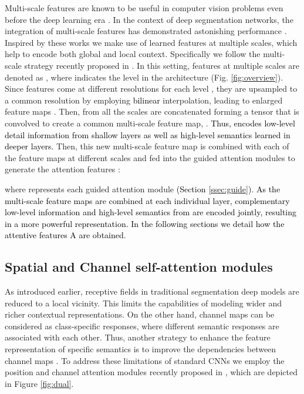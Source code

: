 \documentclass[journal]{IEEEtran}
\begin{document}
Multi-scale features are known to be useful in computer vision problems even before the deep learning era \cite{arbelaez2010contour}. In the context of deep segmentation networks, the integration of multi-scale features has demonstrated astonishing performance \cite{chen2016attention,hariharan2015hypercolumns,mostajabi2015feedforward}.
Inspired by these works we make use of learned features at multiple scales, which help to encode both global and local context. Specifically we follow the multi-scale strategy recently proposed in \cite{wang18d}. In this setting, features at multiple scales are denoted as , where  indicates the level in the architecture (Fig. \ref{fig:overview}). Since features come at different resolutions for each level , they are upsampled to a common resolution by employing \textcolor{black}{bilinear} interpolation, leading to enlarged feature maps . Then,  from all the scales are concatenated forming a tensor that is convolved to create a common multi-scale feature map, . \textcolor{black}{Thus,  encodes low-level detail information from shallow layers as well as high-level semantics learned in deeper layers.} Then, this new multi-scale feature map is combined with each of the feature maps at different scales  and fed into the guided attention modules to generate the attention features :



where  represents each guided attention module \textcolor{black}{(Section \ref{ssec:guide})}. \textcolor{black}{As the multi-scale feature maps  are combined at each individual layer, complementary low-level information and high-level semantics from  are encoded jointly, resulting in a more powerful representation. In the following sections we detail how the attentive features A are obtained.}


\subsection{Spatial and Channel self-attention modules}
As introduced earlier, receptive fields in traditional segmentation deep models are reduced to a local vicinity. This limits the capabilities of modeling wider and richer contextual representations. On the other hand, channel maps can be considered as class-specific responses, where different semantic responses are associated with each other. Thus, another strategy to enhance the feature representation of specific semantics is to improve the dependencies between channel maps \cite{chen2017sca}. To address these limitations of standard CNNs we employ the position and channel attention modules recently proposed in \cite{fu2018dual}, which are depicted in Figure \ref{fig:dual}.
\end{document}
